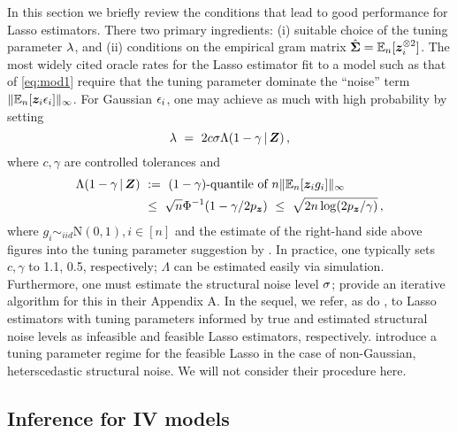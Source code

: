 \documentclass{uwstat572}
\newcommand{\be}{\begin{equation}}
\newcommand{\ee}{\end{equation}}
\theoremstyle{definition}
\theoremstyle{remark}
\newcommand{\Q}{\mathbb{Q}}
\newcommand{\ga}{\alpha}
\newcommand{\gep}{\epsilon}
\newcommand{\gth}{\theta}
\newcommand{\E}{\mathrm{E}}
\newcommand{\Ex}{\mathbb{E}}
\newcommand{\Exn}{\Ex_n}
\newcommand{\Normal}{\mathrm{N}}
\newcommand{\bs}[1]{\boldsymbol{#1}}
\numberwithin{equation}{section}
\begin{document}
In this section we briefly review the conditions that lead to good performance for Lasso estimators. There two primary ingredients: (i) suitable choice of the tuning parameter $\lambda$, and (ii) conditions on the empirical gram matrix $\gramhat = \Exn[\z_i^{\kpt}]$. The most widely cited oracle rates for the Lasso estimator fit to a model such as that of \eqref{eq:mod1} require that the tuning parameter dominate the ``noise'' term $\|\Exn[\z_i\ersi]\|_\infty$. For Gaussian $\ersi$, \cite{BC13} one may achieve as much with high probability by setting
\be\label{tune1}
	\tune \ = \ 2 c \sd \Lambda(1-\gamma\,|\,\Z)\,,
\ee
where $c, \gamma$ are controlled tolerances and 
\begin{align*}
	\Lambda(1 - \gamma\,|\,\Z) \ & := \ (1-\gamma)\text{-quantile of } n\|\Exn[\z_ig_i]\|_\infty\\
	& \leq \ \sqrt{n}\Phi^{-1}(1-\gamma/2\pz) \ \leq \ \sqrt{2n\log(2\pz/\gamma)} \,,
\end{align*}
where $g_i \sim_{iid} \Normal(0,1), i\in[n]$ and the estimate of the right-hand side above figures into the tuning parameter suggestion by \cite{BRT09}. In practice, one typically sets $c,\gamma$ to 1.1, 0.5, respectively; $\Lambda$ can be estimated easily via simulation. Furthermore, one must estimate the structural noise level $\sigma$; \cite{BCH11} provide an iterative algorithm for this in their Appendix A. In the sequel, we refer, as do \cite{BCH11}, to Lasso estimators with tuning parameters informed by true and estimated structural noise levels as infeasible and feasible Lasso estimators, respectively. \cite{BCCH12} introduce a tuning parameter regime for the feasible Lasso in the case of non-Gaussian, heterscedastic structural noise. We will not consider their procedure here. 






%
%
\subsection{Inference for IV models}
\newcommand{\regt}{\gth}
\newcommand{\regg}{\bs{\gamma}}
\newcommand{\rega}{\bs{\ga}}
\newcommand{\regahat}{\hat{\rega}}
\newcommand{\erfi}{v_i}
\newcommand{\erfc}{v}
\newcommand{\ersc}{\gep}
\newcommand{\sds}{\sd_\ersc}
\newcommand{\sdf}{\sd_\erfc}
\renewcommand{\a}{\bs{a}}
\newcommand{\ahat}{\hat{\a}}
\newcommand{\sdfs}{\sd_{\erfc\ersc}}
\newcommand{\xinst}{\x^\dagger}
\newcommand{\xinsti}{x_i^\dagger}
\newcommand{\ainst}{\a^\dagger}
\newcommand{\ainsti}{\a_i^\dagger}
\newcommand{\ainstihat}{\hat{\a}_i^\dagger}
\newcommand{\ainstihatkpt}{\hat{\a}_i^{\dagger\kpt}}
\newcommand{\ainstikpt}{\a_i^{\dagger\kpt}}
\newcommand{\ainstkpt}{\a^{\dagger\kpt}}
\renewcommand{\rm}{\bs{\Delta}}
\newcommand{\g}{\bs{g}}
\renewcommand{\Q}{\bs{Q}}
\newcommand{\Qn}{\Q_n}
\newcommand{\Qnhat}{\hat{\Q}_n}
\newcommand{\Om}{\bs{\Omega}}
\newcommand{\Omn}{\Om_n}
\newcommand{\EEn}{\bar{\E}}
\newcommand{\regaiv}{\regahat^\dagger}
\newcommand{\sdshat}{\hat{\sds}}
\end{document}
